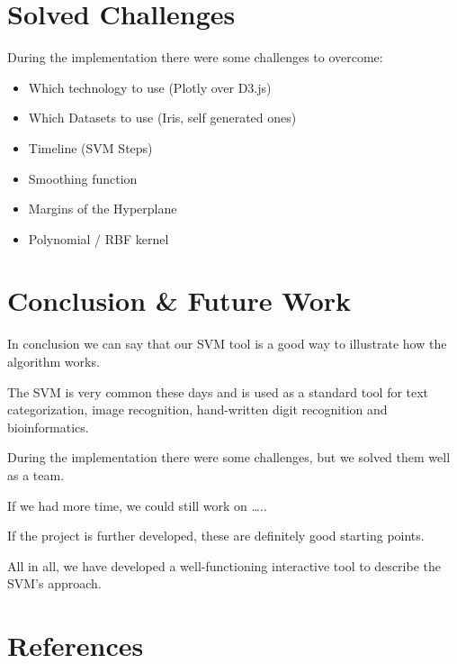 \documentclass{scrartcl}
\begin{document}







\section{Solved Challenges}

During the implementation there were some challenges to overcome:

\begin{itemize}
	\item Which technology to use (Plotly over D3.js)
	\item Which Datasets to use (Iris, self generated ones)
	\item Timeline (SVM Steps) 
	\item Smoothing function
	\item Margins of the Hyperplane
	\item Polynomial / RBF kernel 
\end{itemize}




\section{Conclusion \& Future Work}
In conclusion we can say that our SVM tool is a good way to illustrate how the algorithm works. 

The SVM is very common these days and is used as a standard tool for text categorization, image recognition, hand-written digit recognition and bioinformatics. 

During the implementation there were some challenges, but we solved them well as a team.

If we had more time, we could still work on ….. 

If the project is further developed, these are definitely good starting points. 

All in all, we have developed a well-functioning interactive tool to describe the SVM's approach. 

\section{References}
\end{document}
